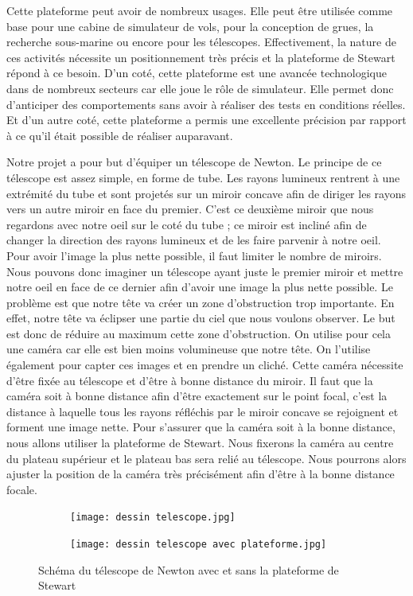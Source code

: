 \documentclass[a4paper,12pt]{article}
\begin{document}
\medskip

Cette plateforme peut avoir de nombreux usages. 
Elle peut être utilisée comme base pour une cabine de simulateur de vols, pour la conception de grues, la recherche
sous-marine ou encore pour les télescopes. 
Effectivement, la nature de ces activités nécessite un positionnement très précis et la plateforme de
Stewart répond à ce besoin. 
D’un coté, cette plateforme est une avancée technologique dans de nombreux secteurs car elle joue le rôle de simulateur. Elle permet donc d’anticiper des comportements sans avoir à réaliser des
tests en conditions réelles. Et d’un autre coté, cette plateforme a permis une excellente précision par rapport à ce qu'il était possible de réaliser auparavant.

\medskip

Notre projet a pour but d’équiper un télescope de Newton. 
Le principe de ce télescope est assez simple, en forme de tube. 
Les rayons lumineux rentrent à une extrémité du tube et sont projetés sur un miroir concave afin de diriger les rayons vers un autre miroir en face du premier. 
C’est ce deuxième miroir que nous regardons avec notre oeil sur le coté du tube ; ce miroir est incliné afin de changer la direction des rayons lumineux et de les faire parvenir à notre oeil. 
Pour avoir l’image la plus nette possible, il faut limiter le nombre de miroirs. 
Nous pouvons donc imaginer un télescope ayant juste le premier miroir et mettre notre oeil en face de ce dernier afin d’avoir une image la plus nette possible. 
Le problème est que notre tête va créer un zone d’obstruction trop importante. 
En effet, notre tête va éclipser une partie du ciel que nous voulons observer. 
Le but est donc de réduire au maximum cette zone d’obstruction. 
On utilise pour cela une caméra car elle est bien moins volumineuse que notre tête. 
On l’utilise également pour capter ces images et en prendre un cliché. 
Cette caméra nécessite d’être fixée au télescope et d’être à bonne distance du miroir. 
Il faut que la caméra soit à bonne distance afin d’être exactement sur le point focal, c’est la distance à laquelle tous les rayons réfléchis par le miroir concave se rejoignent et forment une image nette. 
Pour s’assurer que la caméra soit à la bonne distance, nous allons utiliser la plateforme de Stewart. 
Nous fixerons la caméra au centre du plateau supérieur et le plateau bas sera relié au télescope. 
Nous pourrons alors ajuster la position de la caméra très précisément afin d’être à la bonne distance focale. 

\begin{figure}[H]
    \centering
    \begin{subfigure}[]{0.4\textwidth}
        \texttt{[image: dessin telescope.jpg]}
    \end{subfigure}
    \begin{subfigure}[]{0.4\textwidth}
        \texttt{[image: dessin telescope avec plateforme.jpg]}
    \end{subfigure}
    \caption{Schéma du télescope de Newton avec et sans la plateforme de Stewart}
\end{figure}
\end{document}
